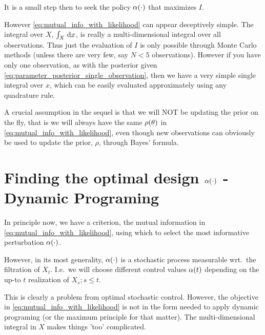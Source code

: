 \documentclass{article}
\begin{document}
It is a small step then to seek the policy ${\alpha}(\cdot)$ that maximizes
$I$.

However \cref{eq:mutual_info_with_likelihood} can appear deceptively
simple. The integral over $X$, $\int_X \, \mathrm{d} x$, is really a multi-dimensional integral
over all observations. Thus just the evaluation of $I$ is only possible through
Monte Carlo methods (unless there are very few,  say $N<5$ observations).
However if you have only one observation, as with the posterior given
\cref{eq:parameter_posterior_single_observation}, then we have a very simple
single integral over $x$, which can be easily evaluated approximately using any
quadrature rule.

A crucial assumption in the sequel is that we will NOT be updating the prior on
the fly, that is we will always have the same $\rho({\theta})$ in
\cref{eq:mutual_info_with_likelihood}, even though new observations can
obviously be used to update the prior, $\rho$, through Bayes' formula.

\section{Finding the optimal design ${\alpha}(\cdot)$ - Dynamic Programing}
\label{sec:DP_4_OptEstimate}
In principle now, we have a criterion, the mutual information in
\cref{eq:mutual_info_with_likelihood}, using which to select the most
informative perturbation ${\alpha}(\cdot)$. 

However, in its most generality, ${\alpha}(\cdot)$ is a stochastic process measurable
wrt.\ the filtration of $X_t$. I.e.\ we will choose different control values
${\alpha}(t)$ depending on the up-to $t$ realization of $X_s ; s\leq t$.

This is clearly a problem from optimal stochastic control. However, the
objective in \cref{eq:mutual_info_with_likelihood} is not in the form
needed to apply dynamic programing (or the maximum principle for that matter).
The multi-dimensional integral in $X$ makes things 'too' complicated. 
\end{document}
